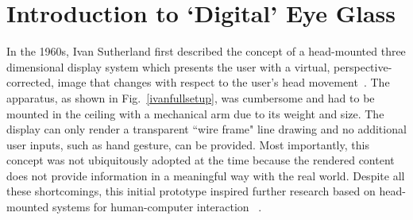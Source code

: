 \section{Introduction to `Digital' Eye Glass}
\label{introdigitalglass}

In the 1960s, Ivan Sutherland first described the concept of a head-mounted three dimensional 
display system which presents the user with a virtual, perspective-corrected, image that changes with 
respect to the user's head movement~\cite{sutherland1968head}. The apparatus, as shown in 
Fig.~\ref{ivanfullsetup}, was cumbersome and had to be mounted in the ceiling with a mechanical arm 
due to its weight and size. The display can only render a transparent ``wire frame" line drawing and no 
additional user inputs, such as hand gesture, can be provided. Most importantly, this concept was not 
ubiquitously adopted at the time because the rendered content does not provide information in a 
meaningful way with the real world. Despite all these shortcomings, this initial prototype inspired 
further research based on head-mounted systems for human-computer interaction 
~\cite{feiner1993knowledge,feiner1997touring,caudell1992augmented,stoakley1995virtual}.


